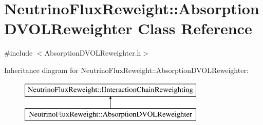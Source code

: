 \hypertarget{class_neutrino_flux_reweight_1_1_absorption_d_v_o_l_reweighter}{\section{Neutrino\-Flux\-Reweight\-:\-:Absorption\-D\-V\-O\-L\-Reweighter Class Reference}
\label{class_neutrino_flux_reweight_1_1_absorption_d_v_o_l_reweighter}
}


{\ttfamily \#include $<$Absorption\-D\-V\-O\-L\-Reweighter.\-h$>$}

Inheritance diagram for Neutrino\-Flux\-Reweight\-:\-:Absorption\-D\-V\-O\-L\-Reweighter\-:\begin{figure}[H]
\begin{center}
\leavevmode
\includegraphics[height=2.000000cm]{class_neutrino_flux_reweight_1_1_absorption_d_v_o_l_reweighter}
\end{center}
\end{figure}
